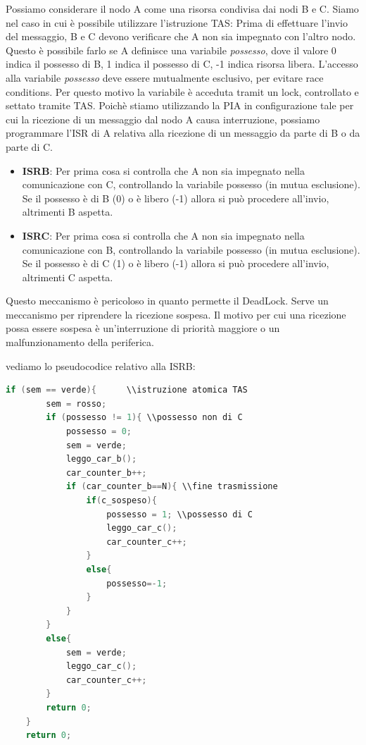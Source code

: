 Possiamo considerare il nodo A come una risorsa condivisa dai nodi B e C. Siamo nel caso in cui è possibile utilizzare l'istruzione TAS: Prima di effettuare l'invio del messaggio, B e C devono verificare che A non sia impegnato con l'altro nodo. Questo è possibile farlo se A definisce una variabile \textit{possesso}, dove il valore 0 indica il possesso di B, 1 indica il possesso di C, -1 indica risorsa libera. L'accesso alla variabile \textit{possesso} deve essere mutualmente esclusivo, per evitare race conditions. Per questo motivo la variabile è acceduta tramit un lock, controllato e settato tramite TAS. 
Poichè stiamo utilizzando la PIA in configurazione tale per cui la ricezione di un messaggio dal nodo A causa interruzione, possiamo programmare l'ISR di A relativa alla ricezione di un messaggio da parte di B o da parte di C. 

\begin{itemize}
    \item \textbf{ISRB}: Per prima cosa si controlla che A non sia impegnato nella comunicazione con C, controllando la variabile possesso (in mutua esclusione). Se il possesso è di B (0) o è libero (-1) allora si può procedere all'invio, altrimenti B aspetta. 
    \item \textbf{ISRC}: Per prima cosa si controlla che A non sia impegnato nella comunicazione con B, controllando la variabile possesso (in mutua esclusione). Se il possesso è di C (1) o è libero (-1) allora si può procedere all'invio, altrimenti C aspetta.
\end{itemize}

Questo meccanismo è pericoloso in quanto permette il DeadLock. Serve un meccanismo per riprendere la ricezione sospesa. Il motivo per cui una ricezione possa essere sospesa è un'interruzione di priorità maggiore o un malfunzionamento della periferica. 

vediamo lo pseudocodice relativo alla ISRB:

\begin{lstlisting}[language=C]
    if (sem == verde){      \\istruzione atomica TAS
        sem = rosso;
        if (possesso != 1){ \\possesso non di C
            possesso = 0;
            sem = verde;
            leggo_car_b();
            car_counter_b++;
            if (car_counter_b==N){ \\fine trasmissione
                if(c_sospeso){
                    possesso = 1; \\possesso di C
                    leggo_car_c();
                    car_counter_c++;
                }
                else{
                    possesso=-1;
                }
            }
        }
        else{
            sem = verde;
            leggo_car_c();
            car_counter_c++;
        }
        return 0;
    }
    return 0;
\end{lstlisting}

